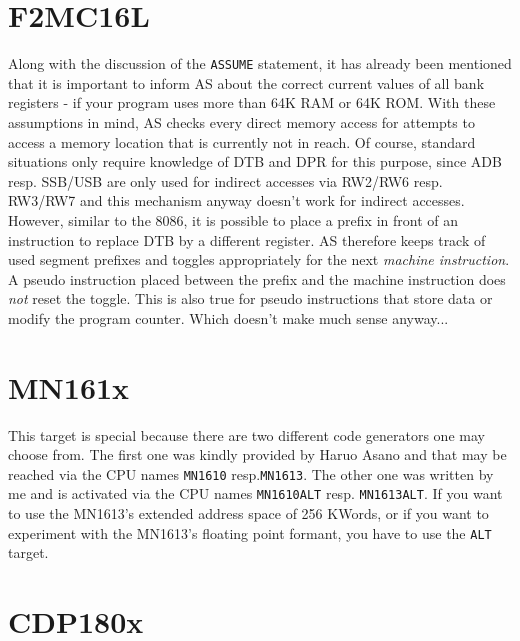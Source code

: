 \documentclass[12pt,twoside]{report}
\newcommand{\tty}[1]{{\tt #1}}
\begin{document}

\section{F2MC16L}

Along with the discussion of the {\tt ASSUME} statement, it has already
been mentioned that it is important to inform AS about the correct current
values of all bank registers - if your program uses more than 64K RAM or
64K ROM.  With these assumptions in mind, AS checks every direct memory
access for attempts to access a memory location that is currently not in
reach.  Of course, standard situations only require knowledge of DTB and
DPR for this purpose, since ADB resp. SSB/USB are only used for indirect
accesses via RW2/RW6 resp. RW3/RW7 and this mechanism anyway doesn't work
for indirect accesses.  However, similar to the 8086, it is possible to
place a prefix in front of an instruction to replace DTB by a different
register.  AS therefore keeps track of used segment prefixes and
toggles appropriately for the next {\em machine instruction}.  A pseudo
instruction placed between the prefix and the machine instruction does
{\em not} reset the toggle.  This is also true for pseudo instructions
that store data or modify the program counter.  Which doesn't make much
sense anyway...


\section{MN161x}

This target is special because there are two different code generators one may
choose from.  The first one was kindly provided by Haruo Asano and that may be
reached via the CPU names \tty{MN1610} resp.\tty{MN1613}.  The other one was
written by me and is activated via the CPU names \tty{MN1610ALT} resp.
\tty{MN1613ALT}.  If you want to use the MN1613's extended address space of
256 KWords, or if you want to experiment with the MN1613's floating point
formant, you have to use the \tty{ALT} target.


\section{CDP180x}
\end{document}
